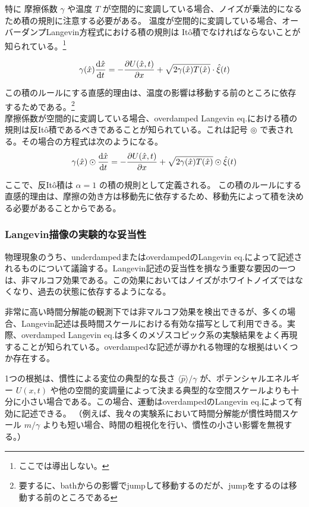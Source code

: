 \documentclass[a4paper,11pt]{jsarticle}
\numberwithin{equation}{section}
\begin{document}
特に
摩擦係数 $\gamma$ や温度 $T$ が空間的に変調している場合、ノイズが乗法的になるため積の規則に注意する必要がある。
温度が空間的に変調している場合、オーバーダンプLangevin方程式における積の規則は Itô積でなければならないことが知られている。\footnote{ここでは導出しない。}

\begin{align}
\gamma(\hat{x}) \dv{\hat{x}}{t} = - \pdv{U(\hat{x}, t)}{x} + \sqrt{2\gamma(\hat{x})T(\hat{x})} \cdot \hat{\xi}(t)
\end{align}

この積のルールにする直感的理由は、温度の影響は移動する前のところに依存するためである。\footnote{要するに、bathからの影響でjumpして移動するのだが、jumpをするのは移動する前のところである}\\

摩擦係数が空間的に変調している場合、overdamped Langevin eq.における積の規則は反Itô積であるべきであることが知られている。これは記号 $\circledcirc$ で表される。その場合の方程式は次のようになる。
\begin{align}
\gamma(\hat{x}) \odot  \dv{\hat{x}}{t}
= - \pdv{U(\hat{x}, t)}{x}
+ \sqrt{2\gamma(\hat{x})T(\hat{x})} \odot  \hat{\xi}(t)
\end{align}

ここで、反Itô積は $\alpha = 1$ の積の規則として定義される。
この積のルールにする直感的理由は、摩擦の効き方は移動先に依存するため、移動先によって積を決める必要があることからである。

\subsubsection{Langevin描像の実験的な妥当性}
物理現象のうち、underdampedまたはoverdampedのLangevin eq.によって記述されるものについて議論する。Langevin記述の妥当性を損なう重要な要因の一つは、非マルコフ効果である。この効果においてはノイズがホワイトノイズではなくなり、過去の状態に依存するようになる。

非常に高い時間分解能の観測下では非マルコフ効果を検出できるが、多くの場合、Langevin記述は長時間スケールにおける有効な描写として利用できる。実際、overdamped Langevin eq.は多くのメゾスコピック系の実験結果をよく再現することが知られている。overdampedな記述が導かれる物理的な根拠はいくつか存在する。

1つの根拠は、慣性による変位の典型的な長さ $\langle \hat{p} \rangle / \gamma$ が、ポテンシャルエネルギー $U(x,t)$ や他の空間的変調量によって決まる典型的な空間スケールよりも十分に小さい場合である。この場合、運動はoverdampedのLangevin eq.によって有効に記述できる。
（例えば、我々の実験系において時間分解能が慣性時間スケール $m/\gamma$ よりも短い場合、時間の粗視化を行い、慣性の小さい影響を無視する。）
\end{document}
